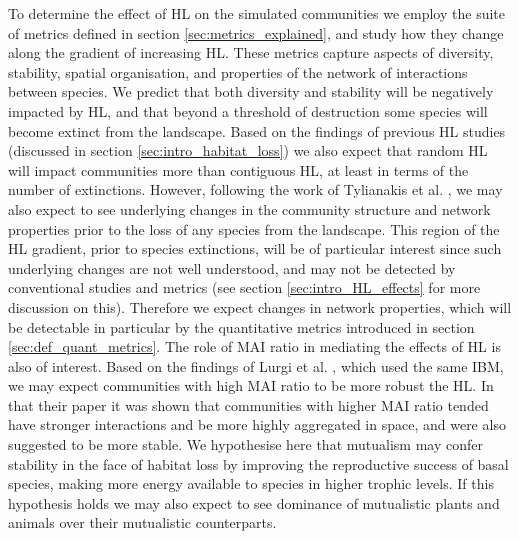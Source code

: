 To determine the effect of HL on the simulated communities we employ the suite of metrics defined in section \ref{sec:metrics_explained}, and study how they change along the gradient of increasing HL. These metrics capture aspects of diversity, stability, spatial organisation, and properties of the network of interactions between species. We predict that both diversity and stability will be negatively impacted by HL, and that beyond a threshold of destruction some species will become extinct from the landscape. Based on the findings of previous HL studies (discussed in section \ref{sec:intro_habitat_loss}) we also expect that random HL will impact communities more than contiguous HL, at least in terms of the number of extinctions. However, following the work of Tylianakis et al. \cite{tylianakis2007habitat}, we may also expect to see underlying changes in the community structure and network properties prior to the loss of any species from the landscape. This region of the HL gradient, prior to species extinctions, will be of particular interest since such underlying changes are not well understood, and may not be detected by conventional studies and metrics (see section \ref{sec:intro_HL_effects} for more discussion on this). Therefore we expect changes in network properties, which will be detectable in particular by the quantitative metrics introduced in section \ref{sec:def_quant_metrics}. The role of MAI ratio in mediating the effects of HL is also of interest. Based on the findings of Lurgi et al. \cite{lurgi2015effects}, which used the same IBM, we may expect communities with high MAI ratio to be more robust the HL. In that their paper it was shown that communities with higher MAI ratio tended have stronger interactions and be more highly aggregated in space, and were also suggested to be more stable. We hypothesise here that mutualism may confer stability in the face of habitat loss by improving the reproductive success of basal species, making more energy available to species in higher trophic levels. If this hypothesis holds we may also expect to see dominance of mutualistic plants and animals over their mutualistic counterparts. 



